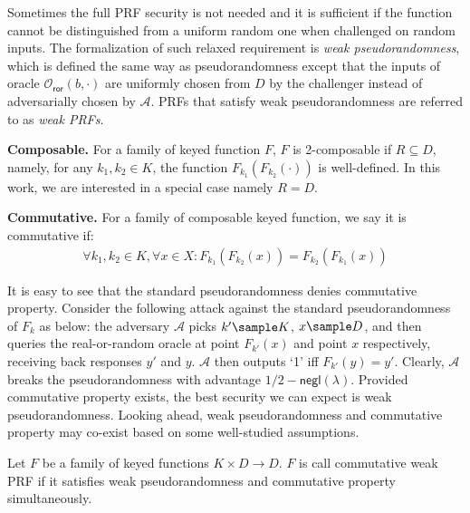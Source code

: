 \documentclass[a4paper,10pt]{article}
\begin{document}
Sometimes the full PRF security is not needed and it is sufficient 
if the function cannot be distinguished from a uniform random one when challenged on random inputs. 
The formalization of such relaxed requirement is \emph{weak pseudorandomness}, 
which is defined the same way as pseudorandomness except that the inputs of 
oracle $\mathcal{O}_\mathsf{ror}(b, \cdot)$ are uniformly chosen from $D$ by the challenger
instead of adversarially chosen by $\mathcal{A}$. 
PRFs that satisfy weak pseudorandomness are referred to as \emph{weak PRFs}.     


\begin{trivlist}
\item \textbf{Composable.} For a family of keyed function $F$, $F$ is 2-composable if $R \subseteq D$, 
    namely, for any $k_1, k_2 \in K$, the function $F_{k_1}(F_{k_2}(\cdot))$ is well-defined. 
    In this work, we are interested in a special case namely $R = D$. 

\item \textbf{Commutative.} For a family of composable keyed function, we say it is commutative if:  
\begin{gather*}
    \forall k_1, k_2 \in K, \forall x \in X: F_{k_1}(F_{k_2}(x)) = F_{k_2}(F_{k_1}(x))
\end{gather*}
\end{trivlist}

It is easy to see that the standard pseudorandomness denies commutative property. 
Consider the following attack against the standard pseudorandomness of $F_k$ as below: 
the adversary $\mathcal{A}$ picks $k' \sample K$, $x \sample D$, 
and then queries the real-or-random oracle at point $F_{k'}(x)$ and point $x$ respectively, 
receiving back responses $y'$ and $y$. $\mathcal{A}$ then outputs `1' iff $F_{k'}(y) = y'$. 
Clearly, $\mathcal{A}$ breaks the pseudorandomness with advantage $1/2 - \mathsf{negl}(\lambda)$.
Provided commutative property exists, the best security we can expect is weak pseudorandomness. 
Looking ahead, weak pseudorandomness and commutative property may co-exist based on some well-studied assumptions. 

\begin{definition}
Let $F$ be a family of keyed functions $K \times D \rightarrow D$.
$F$ is call commutative weak PRF if it satisfies weak pseudorandomness and commutative property simultaneously.   
\end{definition}
\end{document}
